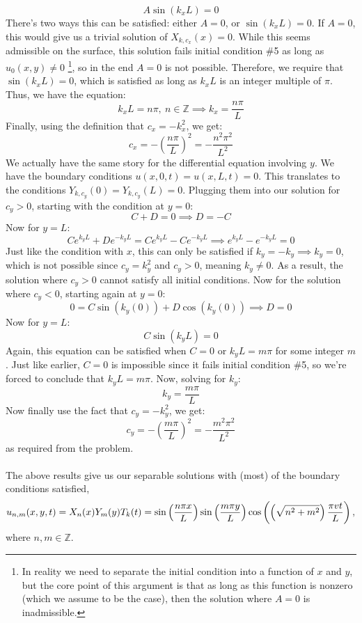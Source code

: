 \documentclass{article}
\begin{document}
\begin{solution}
	\[
	A \sin(k_x L) = 0
	\] 
	There's two ways this can be satisfied: either $A = 0$, or $\sin(k_x L) = 0$. If $A = 0$, this would give
	us a trivial solution of $X_{k, c_x}(x) = 0$. While this seems admissible on the surface, this solution 
	fails initial condition \#5 as long as $u_0(x, y) \neq 0$
	\footnote{In reality we need to separate the initial condition into a function of $x$ and $y$, but 
		the core point of this argument is that as long as this function is nonzero (which we assume to be 
	the case), then the solution where $A = 0$ is inadmissible.}, so in the end $A = 0$ is not possible. Therefore, 
	we require that $\sin(k_x L) = 0$, which is satisfied as long as $k_x L$ is an integer multiple of $\pi$. 
	Thus, we have the equation:
	\[
	k_x L = n \pi, \ n \in \mathbb Z\implies k_x = \frac{n \pi}{L} 
	\] 
	Finally, using the definition that $c_x = -k_x^2$, we get:
	\[
	c_x = -\left( \frac{n \pi}{L} \right)^2 = -\frac{n^2 \pi^2}{L^2}
	\] 
	We actually have the same story for the differential equation involving $y$. We have the boundary
	conditions $u(x, 0, t) = u(x, L, t) = 0$. This translates 
	to the conditions $Y_{k, c_y}(0) = Y_{k, c_y}(L) = 0$. Plugging them into our solution for $c_y > 0$, 
	starting with the condition at $y = 0$:
	\[
	C + D = 0 \implies D = -C
	\] 
	Now for $y = L$:
	\[
		Ce^{k_y L} + De^{-k_y L} = Ce^{k_y L} - Ce^{-k_y L} \implies e^{k_y L} - e^{-k_y L} = 0
	\] 
	Just like the condition with $x$, this can only be satisfied if $k_y = -k_y \implies k_y = 0$, 
	which is not possible since $c_y = k_y^2$ and $c_y > 0$, meaning $k_y \neq 0$. As a result, the solution 
	where $c_y > 0$ cannot satisfy all initial conditions. Now for the solution where $c_y < 0$, starting
	again at $y = 0$: 
	\[
		0 = C \sin(k_y (0))+ D \cos(k_y (0)) \implies D = 0
	\] 
	Now for $y = L$:
	\[
	 C \sin(k_y L) = 0
	\] 
	Again, this equation can be satisfied when $C = 0$ or $k_y L = m \pi$ for some integer $m$. Just like earlier, $C = 0$ 
	is impossible since it fails initial condition \#5, so we're forced to conclude that $k_y L = m\pi$. Now, 
	solving for $k_y$:
	\[
	k_y = \frac{m \pi}{L}
	\] 
	Now finally use the fact that $c_y = -k_y^2$, we get:
	\[
	c_y = -\left( \frac{m \pi}{L} \right)^2 = -\frac{m^2 \pi^2}{L^2}
	\] 
	as required from the problem.
\end{solution}

\phline
\paragraph{}
The above results give us our separable solutions with (most) of the boundary conditions satisfied,
	\begin{equation*}
		u_{n,m}(x,y,t) = X_{n}(x)Y_{m}(y)T_{k}(t) = \sin\left(\frac{n\pi x}{L}\right)\sin\left(\frac{m\pi y}{L}\right)\cos\left(\left(\scalemath{1}{\sqrt{n^{2}+m^{2}}}\right)\frac{\pi vt}{L}\right),
	\end{equation*}
where $n,m\in\mathbb{Z}$.
\end{document}
